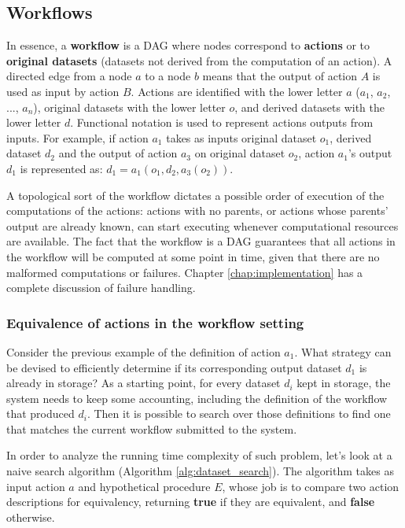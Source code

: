 \subsection{Workflows}
In essence, a \textbf{workflow} is a DAG where nodes correspond to \textbf{actions} or to \textbf{original datasets} (datasets not derived from the computation of an action). A directed edge from a node $a$ to a node $b$ means that the output of action $A$ is used as input by action $B$.  Actions are identified with the lower letter $a$ ($a_1$, $a_2$, ..., $a_n$), original datasets with the lower letter $o$, and derived datasets with the lower letter $d$.  Functional notation is used to represent actions outputs from inputs.  For example, if action $a_1$ takes as inputs original dataset $o_1$, derived dataset $d_2$ and the output of action $a_3$ on original dataset $o_2$, action $a_1$'s output $d_1$ is represented as: $d_1 = a_1(o_1, d_2, a_3(o_2))$.

A topological sort of the workflow dictates a possible order of execution of the computations of the actions: actions with no parents, or actions whose parents' output are already known, can start executing whenever computational resources are available. The fact that the workflow is a DAG guarantees that all actions in the workflow will be computed at some point in time, given that there are no malformed computations or failures.  Chapter \ref{chap:implementation} has a complete discussion of failure handling.

\subsubsection{Equivalence of actions in the workflow setting}
Consider the previous example of the definition of action $a_1$. What strategy can be devised to efficiently determine if its corresponding output dataset $d_1$ is already in storage? As a starting point, for every dataset $d_i$ kept in storage, the system needs to keep some accounting, including the definition of the workflow that produced $d_i$.  Then it is possible to search over those definitions to find one that matches the current workflow submitted to the system.  

In order to analyze the running time complexity of such problem, let's look at a naive search algorithm (Algorithm \ref{alg:dataset_search}). The algorithm takes as input action $a$ and hypothetical procedure $E$, whose job is to compare two action descriptions for equivalency, returning \textbf{true} if they are equivalent, and \textbf{false} otherwise.



